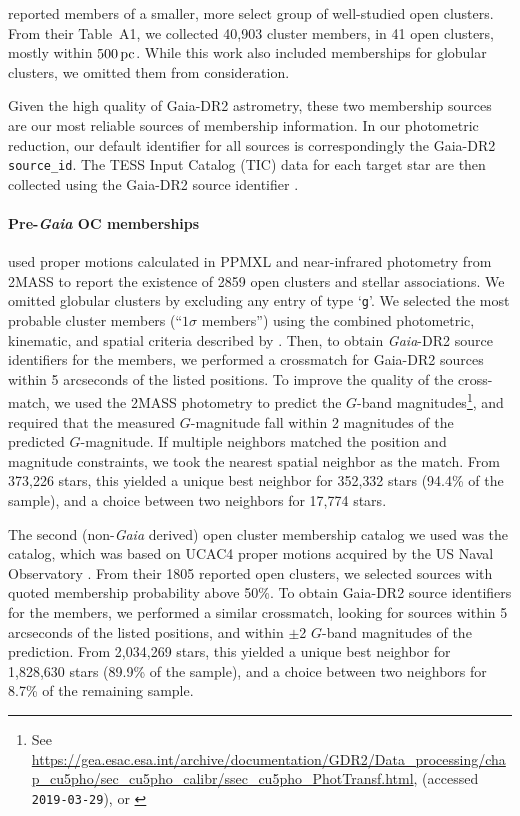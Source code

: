 \documentclass[12pt,twocolumn,tighten,trackchanges]{aastex62}
\begin{document}
\citet{gaia_hr_2018} reported members of a smaller, more select group
of well-studied open clusters. From their Table~A1, we collected
40{,}903 cluster members, in 41 open clusters, mostly within
$500\,{\rm pc}$. While this work also included memberships for
globular clusters, we omitted them from consideration.

Given the high quality of Gaia-DR2 astrometry, these two membership
sources are our most reliable sources of membership information.  In
our photometric reduction,  our default identifier for all sources is
correspondingly the Gaia-DR2 \texttt{source\_id}.  The TESS Input
Catalog (TIC) data for each target star are then collected using the
Gaia-DR2 source identifier \citep{stassun_TIC_2018,stassun_TIC8_2019}.  

\paragraph{Pre-{\it Gaia} OC memberships}

\citet{Kharchenko_et_al_2013} used proper motions calculated in PPMXL
\citep[][a combination of USNO-B1{.}0 and 2MASS
astrometry]{roeser_ppmxl_2010} and near-infrared photometry from 2MASS
\citep{skrutskie_tmass_2006} to report the existence of 2859 open
clusters and stellar associations. We omitted globular clusters by
excluding any entry of type `\texttt{g}'.  We selected the most
probable cluster members (``$1\sigma$ members'') using the combined
photometric, kinematic, and spatial criteria described by
\citet{kharchenko_global_2012}.  Then, to obtain {\it
Gaia}-DR2 source identifiers for the members, we performed a
crossmatch for Gaia-DR2 sources within 5 arcseconds of the listed
positions.  To improve the quality of the cross-match, we used the
2MASS photometry to predict the $G$-band magnitudes\footnote{See
\url{https://gea.esac.esa.int/archive/documentation/GDR2/Data_processing/chap_cu5pho/sec_cu5pho_calibr/ssec_cu5pho_PhotTransf.html},
(accessed \texttt{2019-03-29}), or \citet{carrasco_gaia_2016}}, and
required that the measured $G$-magnitude fall within 2 magnitudes of
the predicted $G$-magnitude.  If multiple neighbors matched the
position and magnitude constraints, we took the nearest spatial
neighbor as the match.  From 373{,}226 stars, this yielded a unique
best neighbor for 352{,}332 stars (94.4\% of the sample), and a choice
between two neighbors for 17{,}774 stars. 

The second (non-{\it Gaia} derived) open cluster membership catalog we
used was the \citet{dias_proper_2014} catalog, which was based on
UCAC4 proper motions acquired by the US Naval Observatory
\citep{zacharias_fourth_2013}.  From their 1805 reported open
clusters, we selected sources with quoted membership probability above
50\%.  To obtain Gaia-DR2 source identifiers for the members, we
performed a similar crossmatch, looking for sources within 5
arcseconds of the listed positions, and within $\pm$2 $G$-band
magnitudes of the prediction.  From 2{,}034{,}269 stars, this yielded
a unique best neighbor for 1{,}828{,}630 stars (89.9\% of the sample),
and a choice between two neighbors for 8.7\% of the remaining sample. 
\end{document}
